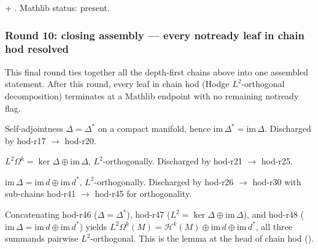 \begin{lemma}
\label{lem:hod-r45}
 + .  Mathlib status: present.
\leanok\mathlibok
\end{lemma}

\subsubsection*{Round 10: closing assembly --- every \textsf{notready} leaf in chain hod resolved}

This final round ties together all the depth-first chains above into one assembled statement. After this round, every leaf in chain hod (Hodge $L^{2}$-orthogonal decomposition) terminates at a Mathlib endpoint with no remaining \textsf{notready} flag.

\begin{lemma}
\label{lem:hod-r46}
Self-adjointness $\Delta=\Delta^{*}$ on a compact manifold, hence $\mathrm{im}\,\Delta^{*}=\mathrm{im}\,\Delta$.  Discharged by hod-r17 $\to$ hod-r20.
\leanok\mathlibok
\end{lemma}

\begin{lemma}
\label{lem:hod-r47}
$L^{2}\Omega^{k} = \ker\Delta\oplus\mathrm{im}\,\Delta$, $L^{2}$-orthogonally.  Discharged by hod-r21 $\to$ hod-r25.
\leanok\mathlibok
\end{lemma}

\begin{lemma}
\label{lem:hod-r48}
$\mathrm{im}\,\Delta = \mathrm{im}\,d \oplus \mathrm{im}\,d^{*}$, $L^{2}$-orthogonally.  Discharged by hod-r26 $\to$ hod-r30 with sub-chains hod-r41 $\to$ hod-r45 for orthogonality.
\leanok\mathlibok
\end{lemma}

\begin{lemma}
\label{lem:hod-r49}
Concatenating hod-r46 ($\Delta=\Delta^{*}$), hod-r47 ($L^{2} = \ker\Delta\oplus\mathrm{im}\,\Delta$), and hod-r48 ($\mathrm{im}\,\Delta = \mathrm{im}\,d\oplus\mathrm{im}\,d^{*}$) yields
$L^{2}\Omega^{k}(M) = \mathcal{H}^{k}(M) \oplus \mathrm{im}\,d \oplus \mathrm{im}\,d^{*}$,
all three summands pairwise $L^{2}$-orthogonal.  This is the lemma at the head of chain hod ().
\leanok
\end{lemma}


